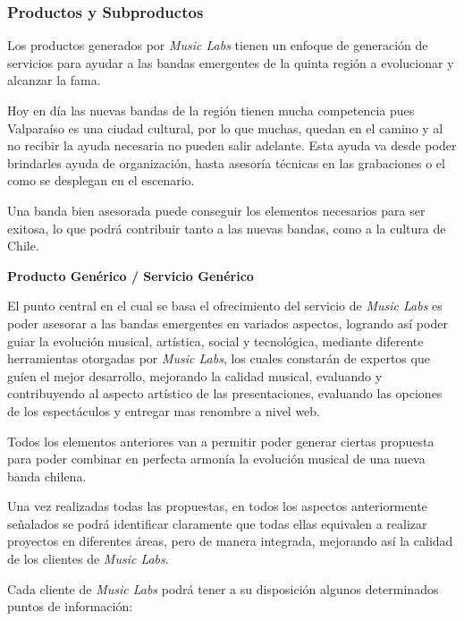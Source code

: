 \newpage
\subsubsection{Productos y Subproductos}


Los productos generados por \emph{Music Labs} tienen un enfoque de generación
de servicios para ayudar a las bandas emergentes de la quinta región
a evolucionar y alcanzar la fama.

Hoy en día las nuevas bandas de la región tienen mucha competencia
pues Valparaíso es una ciudad cultural, por lo que muchas, quedan en el camino
y al no recibir la ayuda necesaria no pueden salir adelante.
Esta ayuda va desde poder brindarles ayuda de organización, hasta asesoría
técnicas en las grabaciones o el como se desplegan en el escenario.

Una banda bien asesorada puede conseguir los elementos necesarios para
ser exitosa, lo que podrá contribuir tanto a las nuevas bandas, como a la cultura
de Chile.

{\bf Producto Genérico / Servicio Genérico}

El punto central en el cual se basa el ofrecimiento del servicio de \emph{Music Labs}
es poder asesorar a las bandas emergentes en variados aspectos,
logrando así poder guiar la evolución musical, artística, social y tecnológica,
mediante diferente herramientas otorgadas por \emph{Music Labs},
los cuales constarán de expertos que guíen el mejor desarrollo,
mejorando la calidad musical, evaluando y contribuyendo al aspecto artístico
de las presentaciones, evaluando las opciones de los espectáculos y entregar
mas renombre a nivel web.

Todos los elementos anteriores van a permitir poder generar ciertas propuesta
para poder combinar en perfecta armonía la evolución musical de una nueva banda chilena.

Una vez realizadas todas las propuestas, en todos los aspectos anteriormente señalados
se podrá identificar claramente que todas ellas equivalen a realizar proyectos en diferentes
áreas, pero de manera integrada, mejorando así la calidad de los clientes de \emph{Music Labs}.

Cada cliente de \emph{Music Labs} podrá tener a su disposición algunos determinados
puntos de información:

